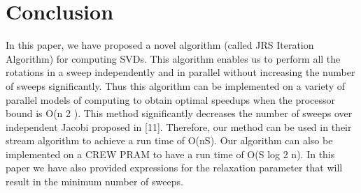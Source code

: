 \documentclass[10pt, conference, compsocconf]{IEEEtran}
\begin{document}
\section{Conclusion}

In this paper, we have proposed a novel algorithm (called
JRS Iteration Algorithm) for computing SVDs. This algorithm
enables us to perform all the rotations in a sweep independently
and in parallel without increasing the number of sweeps
significantly. Thus this algorithm can be implemented on a
variety of parallel models of computing to obtain optimal
speedups when the processor bound is O(n 2 ). This method
significantly decreases the number of sweeps over independent
Jacobi proposed in [11]. Therefore, our method can be used
in their stream algorithm to achieve a run time of O(nS). Our
algorithm can also be implemented on a CREW PRAM to have
a run time of O(S log 2 n). In this paper we have also provided
expressions for the relaxation parameter that will result in the
minimum number of sweeps.

%
%
%



\balance





\end{document}
